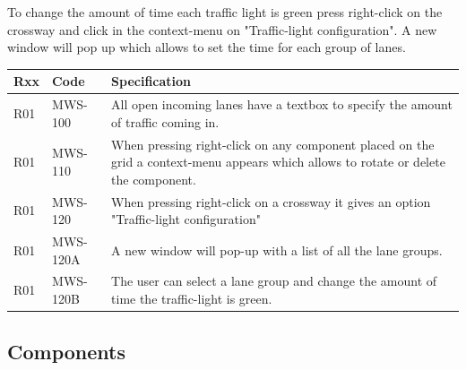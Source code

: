 To change the amount of time each traffic light is green press right-click on the crossway and click in the context-menu on "Traffic-light configuration". A new window will pop up which allows to set the time for each group of lanes.

\begin{tabularx}{\textwidth}{|p{0.5cm}p{2cm}X|}\hline
	Rxx & Code & Specification \\\hline
	R01 & MWS-100 & All open incoming lanes have a textbox to specify the amount of traffic coming in.\\\hline
	R01 & MWS-110 & When pressing right-click on any component placed on the grid a context-menu appears which allows to rotate or delete the component.\\\hline
	R01 & MWS-120 & When pressing right-click on a crossway it gives an option "Traffic-light configuration"\\\hline
	R01 & MWS-120A & A new window will pop-up with a list of all the lane groups.\\\hline
	R01 & MWS-120B & The user can select a lane group and change the amount of time the traffic-light is green.\\\hline
\end{tabularx}

\newpage
\subsection{Components}
\label{sec:components}
